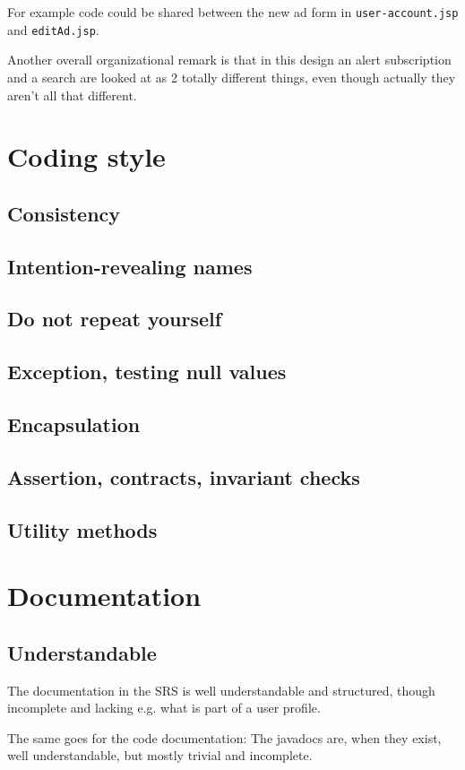 \documentclass[a4wide]{article}
\begin{document}
For example code could be shared between the new ad form in \texttt{user-account.jsp} and \texttt{editAd.jsp}. 

Another overall organizational remark is that in this design an alert subscription and a search are looked at as 2 totally different things, even though actually they aren't all that different. 

\section{Coding style}
\subsection{Consistency}
\subsection{Intention-revealing names}
\subsection{Do not repeat yourself}
\subsection{Exception, testing null values}
\subsection{Encapsulation}
\subsection{Assertion, contracts, invariant checks}
\subsection{Utility methods}
\section{Documentation}
\subsection{Understandable}
The documentation in the SRS is well understandable and structured, though incomplete and lacking e.g. what is part of a user profile.

The same goes for the code documentation: The javadocs are, when they exist, well understandable, but mostly trivial and incomplete.
\end{document}
